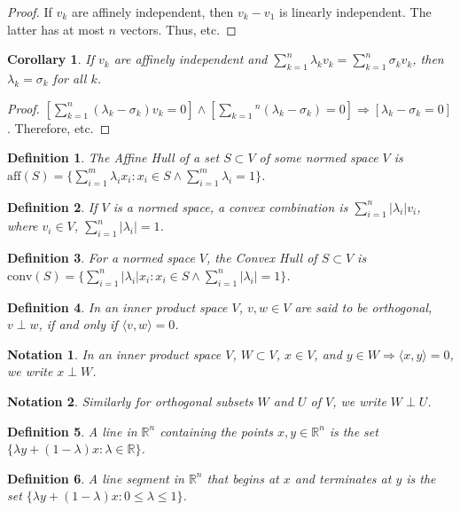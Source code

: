 \documentclass[crop=false,class=book]{standalone}
\theoremstyle{mystyle}
\newtheorem{definition}{Definition}[section]
\newtheorem{corollary}{Corollary}[section]
\newtheorem{notation}{Notation}[section]
\begin{document}
\begin{proof}
If $v_k$ are affinely independent, then $v_k-v_1$ is linearly independent. The latter has at most $n$ vectors. Thus, etc.
\end{proof}
\begin{corollary}
If $v_k$ are affinely independent and $\sum_{k=1}^{n}\lambda_k v_k = \sum_{k=1}^{n} \sigma_k v_k$, then $\lambda_k = \sigma_k$ for all $k$.
\end{corollary}
\begin{proof}
$[\sum_{k=1}^{n}(\lambda_k - \sigma_k)v_k = 0]\land[\sum_{k=1}{^n}(\lambda_k-\sigma_k) = 0]\Rightarrow [\lambda_k-\sigma_k = 0]$. Therefore, etc.
\end{proof}
\begin{definition}
The Affine Hull of a set $S\subset V$ of some normed space $V$ is $\textrm{aff}(S) = \{\sum_{i=1}^{m}\lambda_i x_i: x_i \in S\land \sum_{i=1}^{m}\lambda_i =1\}$.
\end{definition}
\begin{definition}
If $V$ is a normed space, a convex combination is $\sum_{i=1}^{n}|\lambda_i| v_i$, where $v_i\in V$, $\sum_{i=1}^{n}|\lambda_i| = 1$.
\end{definition}
\begin{definition}
For a normed space $V$, the Convex Hull of $S\subset V$ is $\textrm{conv}(S)=\{\sum_{i=1}^{n}|\lambda_i| x_i:x_i\in S\land \sum_{i=1}^{n} |\lambda_i| = 1 \}$.
\end{definition}
\begin{definition}
In an inner product space $V$, $v,w\in V$ are said to be orthogonal, $v\perp w$, if and only if $\langle v,w \rangle = 0$.
\end{definition}
\begin{notation}
In an inner product space $V$, $W\subset V$, $x\in V$, and $y\in W \Rightarrow \langle x,y\rangle = 0$, we write $x\perp W$.
\end{notation}
\begin{notation}
Similarly for orthogonal subsets $W$ and $U$ of $V$, we write $W\perp U$.
\end{notation}
\begin{definition}
A line in $\mathbb{R}^n$ containing the points $x,y\in \mathbb{R}^n$ is the set $\{\lambda y + (1-\lambda)x: \lambda \in \mathbb{R}\}$.
\end{definition}
\begin{definition}
A line segment in $\mathbb{R}^n$ that begins at $x$ and terminates at $y$ is the set $\{\lambda y + (1-\lambda)x: 0\leq \lambda \leq 1 \}$.
\end{definition}
\end{document}

